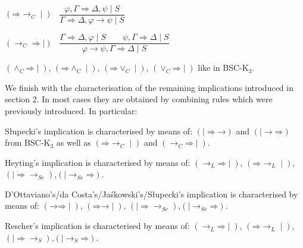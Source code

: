 \documentclass[11pt,a4paper,titlepage]{article}
\theoremstyle{definition}
\newcommand{\3}{\vspace{.3in}}
\newcommand{\2}{\vspace{.2in}}
\newcommand{\1}{\vspace{.1in}}
\newcommand{\5}{\vspace{.05in}}
\begin{document}
	
\begin{flushleft}
		$(\mathord{\Rightarrow}\mathord{\rightarrow_C\mid})$ \ $\dfrac{\varphi, \Gamma
		\Rightarrow \Delta, \psi \mid S}{\Gamma\Rightarrow\Delta, \varphi\rightarrow\psi \mid S}$
\end{flushleft} 
\begin{flushleft}
		$(\mathord{\rightarrow_C}\mathord{\Rightarrow\mid})$ \ $\dfrac{\Gamma
		\Rightarrow \Delta, \varphi \mid S \qquad\psi,
		\Gamma \Rightarrow \Delta \mid S } {\varphi\rightarrow\psi, \Gamma
		\Rightarrow \Delta \mid S}$
\end{flushleft}

$(\mathord{\wedge_C}\mathord{\Rightarrow}\mid)$,
$(\mathord{\Rightarrow}\mathord{\wedge_C}\mid)$, $(\mathord{\Rightarrow}\mathord{\vee_C}\mid)$,
$(\mathord{\vee_C}\mathord{\Rightarrow}\mid)$ like in BSC-K$_3$. 

\1

We finish with the characterisation of the remaining implications introduced in section 2. In most cases they are obtained by combining rules which were previously introduced. In particular:

S\l upecki's \cite{Slupecki67} implication is characterised by means of:
$(\mathord{\mid\Rightarrow}\mathord{\rightarrow})$ and $(\mathord{\mid \rightarrow}\mathord{\Rightarrow})$ from BSC-K$_3$ as well as $(\mathord{\Rightarrow}\mathord{\rightarrow_C}\mid)$ and $(\mathord{\rightarrow_C}\mathord{\Rightarrow}\mid)$.

Heyting's implication \cite{Heyting} is characterised by means of:
$(\mathord{\rightarrow_L}\mathord{\Rightarrow}\mid)$, $(\mathord{\Rightarrow}\mathord{\rightarrow_L}\mid)$, $(\mathord{\mid\Rightarrow}\mathord{\rightarrow_{Se}})$,$(\mathord{\mid \rightarrow_{Se}}\mathord{\Rightarrow})$.

D'Ottaviano's/da Costa's/Ja\'{s}kowski's/S\l{}upecki's implication \cite{DOttavianodaCosta,Jaskowski48,Slupecki39} is characterised by means of:
$(\mathord{\rightarrow}\mathord{\Rightarrow}\mid)$, $(\mathord{\Rightarrow}\mathord{\rightarrow}\mid)$, $(\mathord{\mid\Rightarrow}\mathord{\rightarrow_{Se}})$,$(\mathord{\mid \rightarrow_{Se}}\mathord{\Rightarrow})$.

Rescher's implication \cite{Rescher} is characterised by means of:
$(\mathord{\rightarrow_L}\mathord{\Rightarrow}\mid)$, $(\mathord{\Rightarrow}\mathord{\rightarrow_L}\mid)$, $(\mathord{\mid\Rightarrow}\mathord{\rightarrow_{S}})$,$(\mathord{\mid \rightarrow_{S}}\mathord{\Rightarrow})$.
\end{document}
